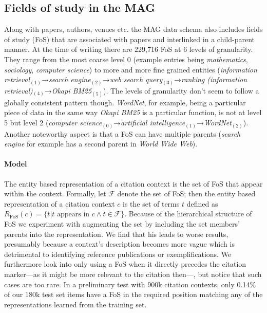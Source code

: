 \subsection{Fields of study in the MAG}\label{sec:approachfos}
Along with papers, authors, venues etc. the MAG data schema also includes fields of study (FoS) that are associated with papers and interlinked in a child-parent manner. At the time of writing there are 229,716 FoS at 6 levels of granularity. They range from the most coarse level 0 (example entries being \emph{mathematics}, \emph{sociology},  \emph{computer science}) to more and more fine grained entities (\emph{information retrieval}$_{(1)}$→\emph{search engine}$_{(2)}$→\emph{web search query}$_{(3)}$→\emph{ranking (information retrieval)}$_{(4)}$→\emph{Okapi BM25}$_{(5)}$). The levels of granularity don't seem to follow a globally consistent pattern though. \emph{WordNet}, for example, being a particular piece of data in the same way \emph{Okapi BM25} is a particular function, is not at level 5 but level 2 (\emph{computer science}$_{(0)}$→\emph{artificial intelligence}$_{(1)}$→\emph{WordNet}$_{(2)}$). Another noteworthy aspect is that a FoS can have multiple parents (\emph{search engine} for example has a second parent in \emph{World Wide Web}).

\paragraph{Model} The entity based representation of a citation context is the set of FoS that appear within the context. Formally, let $\mathcal{F}$ denote the set of FoS; then the entity based representation of a citation context $c$ is the set of terms $t$ defined as ${R_{\text{FoS}}(c) = \{t|t\text{ appears in }c \land t\in \mathcal{F}\}}$. Because of the hierarchical structure of FoS we experiment with augmenting the set by including the set members' parents into the representation. We find that his leads to worse results, presumably because a context's description becomes more vague which is detrimental to identifying reference publications or exemplifications. We furthermore look into only using a FoS when it directly precedes the citation marker---as it might be more relevant to the citation then---, but notice that such cases are too rare. In a preliminary test with 900k citation contexts, only 0.14\% of our 180k test set items have a FoS in the required position matching any of the representations learned from the training set.

